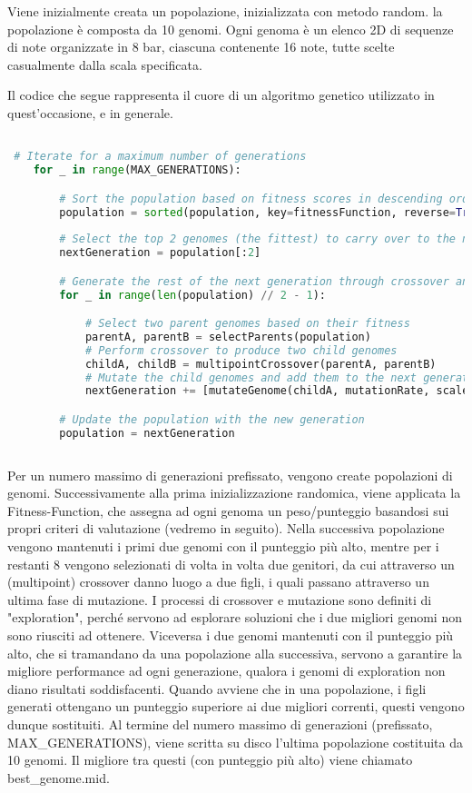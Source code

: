 \documentclass[a4paper,12pt]{report}
\begin{document}
Viene inizialmente creata un popolazione, inizializzata con metodo random. la popolazione è composta da 10 genomi. Ogni genoma è un elenco 2D di sequenze di note organizzate in 8 bar, ciascuna contenente 16 note, tutte scelte casualmente dalla scala specificata.

Il codice che segue rappresenta il cuore di un algoritmo genetico utilizzato in quest'occasione, e in generale.

\begin{lstlisting}[language=Python]

 # Iterate for a maximum number of generations
    for _ in range(MAX_GENERATIONS):

        # Sort the population based on fitness scores in descending order
        population = sorted(population, key=fitnessFunction, reverse=True)
        
        # Select the top 2 genomes (the fittest) to carry over to the next generation
        nextGeneration = population[:2]

        # Generate the rest of the next generation through crossover and mutation
        for _ in range(len(population) // 2 - 1):

            # Select two parent genomes based on their fitness
            parentA, parentB = selectParents(population)
            # Perform crossover to produce two child genomes
            childA, childB = multipointCrossover(parentA, parentB)
            # Mutate the child genomes and add them to the next generation
            nextGeneration += [mutateGenome(childA, mutationRate, scale), mutateGenome(childB, mutationRate, scale)]

        # Update the population with the new generation
        population = nextGeneration
        
\end{lstlisting}

Per un numero massimo di generazioni prefissato, vengono create popolazioni di genomi.
Successivamente alla prima inizializzazione randomica, viene applicata la Fitness-Function, che assegna ad ogni genoma un peso/punteggio basandosi sui propri criteri di valutazione (vedremo in seguito).
Nella successiva popolazione vengono mantenuti i primi due genomi con il punteggio più alto, mentre per i restanti 8 vengono selezionati di volta in volta due genitori, da cui attraverso un (multipoint) crossover danno luogo a due figli, i quali passano attraverso un ultima fase di mutazione.
I processi di crossover e mutazione sono definiti di "exploration", perché servono ad esplorare soluzioni che i due migliori genomi non sono riusciti ad ottenere.
Viceversa i due genomi mantenuti con il punteggio più alto, che si tramandano da una popolazione alla successiva, servono a garantire la migliore performance ad ogni generazione, qualora i genomi di exploration non diano risultati soddisfacenti.
Quando avviene che in una popolazione, i figli generati ottengano un punteggio superiore ai due migliori correnti, questi vengono dunque sostituiti.
Al termine del numero massimo di generazioni (prefissato, MAX_GENERATIONS), viene scritta su disco l'ultima popolazione costituita da 10 genomi.
Il migliore tra questi (con punteggio più alto) viene chiamato best_genome.mid.
\end{document}
